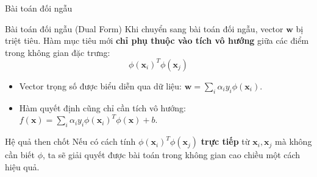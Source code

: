 \begin{frame}{Bài toán đối ngẫu}
  \begin{block}{Bài toán đối ngẫu (Dual Form)}
    Khi chuyển sang bài toán đối ngẫu, vector $\mathbf{w}$ bị triệt tiêu. Hàm mục tiêu mới \textbf{chỉ phụ thuộc vào tích vô hướng} giữa các điểm trong không gian đặc trưng:
    \[
    \phi(\mathbf{x}_i)^T \phi(\mathbf{x}_j)
    \]
  \end{block}
  
  \begin{itemize}
    \item Vector trọng số được biểu diễn qua dữ liệu: $\mathbf{w} = \sum_{i} \alpha_i y_i \phi(\mathbf{x}_i)$.
    \item Hàm quyết định cũng chỉ cần tích vô hướng: $f(\mathbf{x}) = \sum_{i} \alpha_i y_i \phi(\mathbf{x}_i)^T \phi(\mathbf{x}) + b$.
  \end{itemize}
  
  \begin{alertblock}{Hệ quả then chốt}
    Nếu có cách tính $\phi(\mathbf{x}_i)^T \phi(\mathbf{x}_j)$ \textbf{trực tiếp} từ $\mathbf{x}_i, \mathbf{x}_j$ mà không cần biết $\phi$, ta sẽ giải quyết được bài toán trong không gian cao chiều một cách hiệu quả.
  \end{alertblock}
\end{frame}




